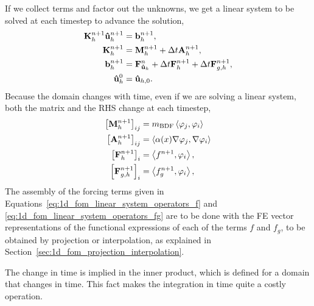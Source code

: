 \documentclass[../main.tex]{subfiles}
\newcommand{\inner}[2]{\left<#1, #2\right>}
\begin{document}
If we collect terms and factor out the unknowns, we get a linear system to be solved at each timestep to advance the solution,
\begin{subequations}
    \begin{align}
        \label{eq:1d_fom_linear_system_timestep}
        \vb{K}_h^{n+1} \vb{\hat{u}}_h^{n+1} &= \vb{b}_h^{n+1}, \\
        \vb{K}_h^{n+1} &= \vb{M}_{h}^{n+1} + \Delta t \vb{A}_{h}^{n+1}, \\
        \vb{b}_h^{n+1} &= \vb{F}_{\vb{\hat{u}}_h}^{n} + \Delta t \vb{F}_h^{n+1} + \Delta t \vb{F}_{g,h}^{n+1}, \\
        \vb{\hat{u}}_h^{0} &= \vb{\hat{u}}_{h,0}.
    \end{align}
\end{subequations}
Because the domain changes with time, even if we are solving a linear system, both the matrix and the RHS change at each timestep,
\begin{subequations}
    \label{eq:1d_fom_linear_system_operators}
    \begin{align}
        \left[\vb{M}_{h}^{n+1}\right]_{ij} &= m_{\text{BDF}} \inner{\varphi_j}{\varphi_i}  \\
        \left[\vb{A}_{h}^{n+1}\right]_{ij} &= \inner{\alpha(x) \grad \varphi_j}{\grad \varphi_i} \\
        \left[\vb{F}_{h}^{n+1}\right]_{i} &= \inner{f^{n+1}}{\varphi_i}, \label{eq:1d_fom_linear_system_operators_f} \\
        \left[\vb{F}_{{g,h}}^{n+1}\right]_{i} &= \inner{f_g^{n+1}}{\varphi_i}, \label{eq:1d_fom_linear_system_operators_fg}
    \end{align}
\end{subequations}
The assembly of the forcing terms given in Equations~\eqref{eq:1d_fom_linear_system_operators_f} and \eqref{eq:1d_fom_linear_system_operators_fg}
are to be done with the FE vector representations of the functional expressions of each of the terms $f$ and $f_g$, to be obtained by projection or interpolation, as explained in Section~\ref{sec:1d_fom_projection_interpolation}.

The change in time is implied in the inner product, which is defined for a domain that changes in time. 
This fact makes the integration in time quite a costly operation.
\end{document}
